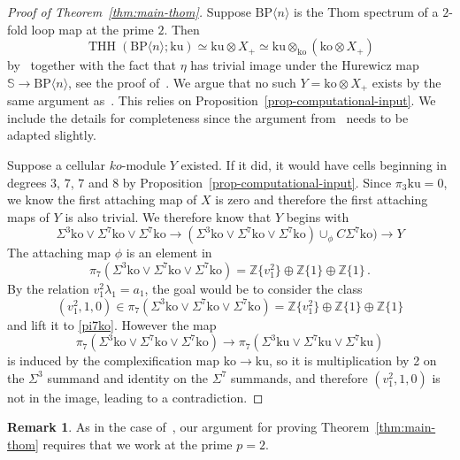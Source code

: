 \documentclass[11pt]{amsart}
\newcommand{\mr}[1]{\mathrm{#1}}
\newcommand{\BP}{\mr{BP}}
\DeclareMathOperator{\THH}{THH}
\theoremstyle{definition}
\newtheorem{remark}[equation]{Remark}
\numberwithin{equation}{section}
\numberwithin{figure}{section}
\begin{document}
\begin{proof}[Proof of Theorem~\ref{thm:main-thom}] 
Suppose $\BP\langle n\rangle$ is the Thom spectrum of a $2$-fold loop map at the prime $2$. Then 
\[ \THH(\BP\langle n\rangle;\mathrm{ku})\simeq \mathrm{ku} \otimes X_{+}\simeq \mathrm{ku} \otimes_{\mathrm{ko}}(\mathrm{ko} \otimes X_+)
\]
by~\cite[Theorem~2]{BCS10} together with the fact that $\eta$ has trivial image under the Hurewicz map $\mathbb{S}\to \BP\langle n\rangle$, see the proof of~\cite[Theorem~2]{Bea17}. We argue that no such $Y=\mathrm{ko}\otimes X_{+}$ exists by the same argument as~\cite{AHL09}. This relies on Proposition~\ref{prop-computational-input}. We include the details for completeness since the argument from~\cite{AHL09} needs to be adapted slightly. 

Suppose a cellular $ko$-module $Y$ existed. If it did, it would have cells beginning in degrees $3$, $7$, $7$ and $8$ by Proposition~\ref{prop-computational-input}. Since $\pi_3\mathrm{ku}=0$, we know the first attaching map of $X$ is zero and therefore the first attaching maps of $Y$ is also trivial. We therefore know that $Y$ begins with 
\[ \Sigma^{3}\mathrm{ko}\vee \Sigma^{7}\mathrm{ko}\vee \Sigma^{7}\mathrm{ko}\to (\Sigma^{3}\mathrm{ko}\vee \Sigma^{7}\mathrm{ko}\vee \Sigma^{7}\mathrm{ko})\cup_{\phi} C\Sigma^{7}\mathrm{ko})\to Y
\]
The attaching map $\phi$ is an element in 
\begin{equation}\label{pi7ko}\pi_{7} (\Sigma^{3}\mathrm{ko}\vee \Sigma^{7}\mathrm{ko}\vee \Sigma^{7}\mathrm{ko})=\mathbb{Z}\{v_1^2\}\oplus \mathbb{Z}\{1\}\oplus \mathbb{Z}\{1\} \,.
\end{equation}
By the relation $v_1^2\lambda_1=a_1$, the goal would be to consider the class 
\[
(v_1^2,1,0) \in \pi_{7} (\Sigma^{3}\mathrm{ko}\vee \Sigma^{7}\mathrm{ko}\vee \Sigma^{7}\mathrm{ko})=\mathbb{Z}\{v_1^2\}\oplus \mathbb{Z}\{1\}\oplus \mathbb{Z}\{1\} 
\]
and lift it to \eqref{pi7ko}. However the map 
\[
\pi_7(\Sigma^{3}\mathrm{ko}\vee \Sigma^{7}\mathrm{ko}\vee \Sigma^{7}\mathrm{ko})  \to 
\pi_7(\Sigma^{3}\mathrm{ku}\vee \Sigma^{7}\mathrm{ku}\vee \Sigma^{7}\mathrm{ku}) 
\]
is induced by the complexification map $\mathrm{ko}\to \mathrm{ku}$, so it is multiplication by 2 on the $\Sigma^3$ summand and identity on the $\Sigma^7$ summands, and therefore $(v_1^2,1,0)$ is not in the image, leading to a contradiction. 
\end{proof}

\begin{remark}
As in the case of~\cite{AHL09}, our argument for proving Theorem~\ref{thm:main-thom} requires that we work at the prime $p=2$. 
\end{remark}
\end{document}
